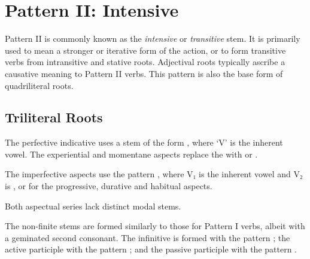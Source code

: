 \documentclass[grammar]{subfiles}
\begin{document}
\clearpage
\section{Pattern II: Intensive}
\label{sec:vm:pattern_ii}

Pattern II is commonly known as the \emph{intensive} or \emph{transitive} stem.
It is primarily used to mean a stronger or iterative form of the action, or to
form transitive verbs from intransitive and stative roots.  Adjectival roots
typically ascribe a causative meaning to Pattern II verbs.  This pattern is
also the base form of quadriliteral roots. 


%



\subsection{Triliteral Roots}
\label{ssec:vm:ii_triliteral}

The perfective indicative uses a stem of the form , where ‘V’ is
the inherent vowel.  The experiential and momentane aspects replace the 
with  or .  

The imperfective aspects use the pattern , where V₁ is the
inherent vowel and V₂ is ,  or  for the progressive,
durative and habitual aspects. 

Both aspectual series lack distinct modal stems.

The non-finite stems are formed similarly to those for Pattern I verbs, albeit
with a geminated second consonant.  The infinitive is formed with the pattern
; the active participle with the pattern ; and
the passive participle with the pattern .
\end{document}
